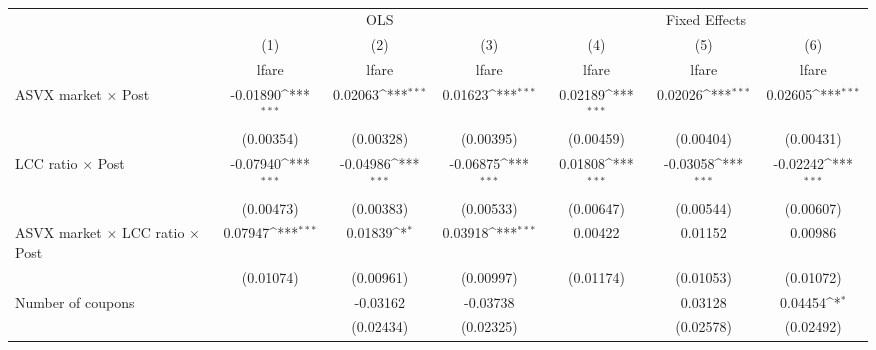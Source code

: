 \begin{table}[htbp]\centering
\def\sym#1{\ifmmode^{#1}\else\(^{#1}\)\fi}
\caption{ \label{post4fare}}
\begin{tabular}{l*{6}{c}}
\toprule
                    &\multicolumn{3}{c}{OLS}                                          &\multicolumn{3}{c}{Fixed Effects}                                \\\cmidrule(lr){2-4}\cmidrule(lr){5-7}
                    &\multicolumn{1}{c}{(1)}&\multicolumn{1}{c}{(2)}&\multicolumn{1}{c}{(3)}&\multicolumn{1}{c}{(4)}&\multicolumn{1}{c}{(5)}&\multicolumn{1}{c}{(6)}\\
                    &\multicolumn{1}{c}{lfare}&\multicolumn{1}{c}{lfare}&\multicolumn{1}{c}{lfare}&\multicolumn{1}{c}{lfare}&\multicolumn{1}{c}{lfare}&\multicolumn{1}{c}{lfare}\\
\midrule
ASVX market $\times$ Post&    -0.01890\sym{***}&     0.02063\sym{***}&     0.01623\sym{***}&     0.02189\sym{***}&     0.02026\sym{***}&     0.02605\sym{***}\\
                    &   (0.00354)         &   (0.00328)         &   (0.00395)         &   (0.00459)         &   (0.00404)         &   (0.00431)         \\
\addlinespace
LCC ratio $\times$ Post&    -0.07940\sym{***}&    -0.04986\sym{***}&    -0.06875\sym{***}&     0.01808\sym{***}&    -0.03058\sym{***}&    -0.02242\sym{***}\\
                    &   (0.00473)         &   (0.00383)         &   (0.00533)         &   (0.00647)         &   (0.00544)         &   (0.00607)         \\
\addlinespace
ASVX market $\times$ LCC ratio $\times$ Post&     0.07947\sym{***}&     0.01839\sym{*}  &     0.03918\sym{***}&     0.00422         &     0.01152         &     0.00986         \\
                    &   (0.01074)         &   (0.00961)         &   (0.00997)         &   (0.01174)         &   (0.01053)         &   (0.01072)         \\
\addlinespace
Number of coupons   &                     &    -0.03162         &    -0.03738         &                     &     0.03128         &     0.04454\sym{*}  \\
                    &                     &   (0.02434)         &   (0.02325)         &                     &   (0.02578)         &   (0.02492)         \\

\end{tabular}
\end{table}
